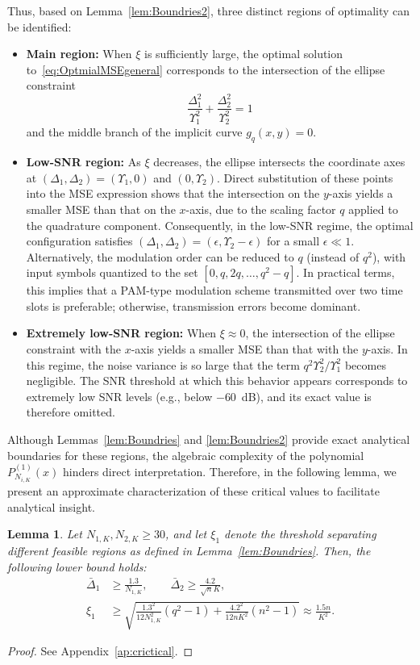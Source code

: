\documentclass[journal,12pt,onecolumn,draftclsnofoot]{IEEEtran}
\newtheorem{lem}{Lemma}
\theoremstyle{definition}
\begin{document}
Thus, based on Lemma~\ref{lem:Boundries2}, three distinct regions of optimality can be identified:  
\begin{itemize}
    \item \textbf{Main region:} When $\xi$ is sufficiently large, the optimal solution to~\eqref{eq:OptmialMSEgeneral} corresponds to the intersection of the ellipse constraint 
    \[
    \frac{\Delta_1^2}{\Upsilon_1^2} + \frac{\Delta_2^2}{\Upsilon_2^2} = 1
    \]
    and the middle branch of the implicit curve $g_q(x,y)=0$. 

    \item \textbf{Low-SNR region:} As $\xi$ decreases, the ellipse intersects the coordinate axes at $(\Delta_1, \Delta_2) = (\Upsilon_1, 0)$ and $(0, \Upsilon_2)$. Direct substitution of these points into the MSE expression shows that the intersection on the $y$-axis yields a smaller MSE than that on the $x$-axis, due to the scaling factor $q$ applied to the quadrature component. Consequently, in the low-SNR regime, the optimal configuration satisfies $(\Delta_1, \Delta_2) = (\epsilon, \Upsilon_2 - \epsilon)$ for a small $\epsilon \ll 1$. Alternatively, the modulation order can be reduced to $q$ (instead of $q^2$), with input symbols quantized to the set $[0, q, 2q, \ldots, q^2 - q]$. In practical terms, this implies that a PAM-type modulation scheme transmitted over two time slots is preferable; otherwise, transmission errors become dominant.

    \item \textbf{Extremely low-SNR region:} When $\xi \approx 0$, the intersection of the ellipse constraint with the $x$-axis yields a smaller MSE than that with the $y$-axis. In this regime, the noise variance is so large that the term $q^2\Upsilon_2^2/\Upsilon_1^2$ becomes negligible. The SNR threshold at which this behavior appears corresponds to extremely low SNR levels (e.g., below $-60$~dB), and its exact value is therefore omitted.
\end{itemize}

Although Lemmas~\ref{lem:Boundries} and \ref{lem:Boundries2} provide exact analytical boundaries for these regions, the algebraic complexity of the polynomial $P_{N_{i,K}}^{(1)}(x)$ hinders direct interpretation. Therefore, in the following lemma, we present an approximate characterization of these critical values to facilitate analytical insight.


\begin{lem}\label{lem:crictical}
Let $N_{1,K}, N_{2,K} \geq 30$, and let $\xi_1$ denote the threshold separating different feasible regions as defined in Lemma~\ref{lem:Boundries}. Then, the following lower bound holds:
\begin{align}
   \bar{\Delta}_1 &  \geq \frac{1.3}{N_{1, K}}, 
   \qquad \bar{\Delta}_2   \geq \frac{4.2}{\sqrt{n}K}, \\
    \xi_1 & \geq \sqrt{\frac{1.3^2}{12N_{1,K}^2}(q^2 - 1) + \frac{4.2^2}{12nK^2}(n^2 - 1)}
    \approx \frac{1.5n}{K^2}.
\end{align}
\end{lem}
\begin{proof}
    See Appendix~\ref{ap:crictical}.
\end{proof}
\end{document}
